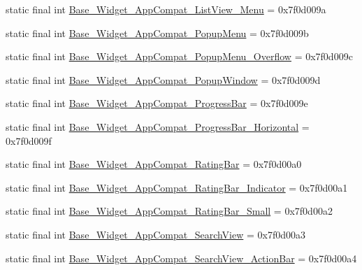 \begin{DoxyCompactItemize}
static final int \mbox{\hyperlink{classandroid_1_1support_1_1design_1_1R_1_1style_a9748000d54fe84d19a7f2ccad569c9bd}{Base\+\_\+\+Widget\+\_\+\+App\+Compat\+\_\+\+List\+View\+\_\+\+Menu}} = 0x7f0d009a
\item 
static final int \mbox{\hyperlink{classandroid_1_1support_1_1design_1_1R_1_1style_a6fc90d604807e924feefb0adf2a7d2cc}{Base\+\_\+\+Widget\+\_\+\+App\+Compat\+\_\+\+Popup\+Menu}} = 0x7f0d009b
\item 
static final int \mbox{\hyperlink{classandroid_1_1support_1_1design_1_1R_1_1style_a98001ced76638358f860dec36e44a24c}{Base\+\_\+\+Widget\+\_\+\+App\+Compat\+\_\+\+Popup\+Menu\+\_\+\+Overflow}} = 0x7f0d009c
\item 
static final int \mbox{\hyperlink{classandroid_1_1support_1_1design_1_1R_1_1style_a49fc2bbb8931372170f422a8229577c2}{Base\+\_\+\+Widget\+\_\+\+App\+Compat\+\_\+\+Popup\+Window}} = 0x7f0d009d
\item 
static final int \mbox{\hyperlink{classandroid_1_1support_1_1design_1_1R_1_1style_a2384abd094179a592f3c1c84ec9aabb7}{Base\+\_\+\+Widget\+\_\+\+App\+Compat\+\_\+\+Progress\+Bar}} = 0x7f0d009e
\item 
static final int \mbox{\hyperlink{classandroid_1_1support_1_1design_1_1R_1_1style_abc208c47da65fac306b8bd7d3296541b}{Base\+\_\+\+Widget\+\_\+\+App\+Compat\+\_\+\+Progress\+Bar\+\_\+\+Horizontal}} = 0x7f0d009f
\item 
static final int \mbox{\hyperlink{classandroid_1_1support_1_1design_1_1R_1_1style_aeb00a759a3ab19c1053273d89650332b}{Base\+\_\+\+Widget\+\_\+\+App\+Compat\+\_\+\+Rating\+Bar}} = 0x7f0d00a0
\item 
static final int \mbox{\hyperlink{classandroid_1_1support_1_1design_1_1R_1_1style_a114549220794f5cf8da42886c05c022b}{Base\+\_\+\+Widget\+\_\+\+App\+Compat\+\_\+\+Rating\+Bar\+\_\+\+Indicator}} = 0x7f0d00a1
\item 
static final int \mbox{\hyperlink{classandroid_1_1support_1_1design_1_1R_1_1style_a7cdc7d47a673704484633b1521a1c956}{Base\+\_\+\+Widget\+\_\+\+App\+Compat\+\_\+\+Rating\+Bar\+\_\+\+Small}} = 0x7f0d00a2
\item 
static final int \mbox{\hyperlink{classandroid_1_1support_1_1design_1_1R_1_1style_afc9c2fe90f72204a9993c2ea0c330d0f}{Base\+\_\+\+Widget\+\_\+\+App\+Compat\+\_\+\+Search\+View}} = 0x7f0d00a3
\item 
static final int \mbox{\hyperlink{classandroid_1_1support_1_1design_1_1R_1_1style_ac5099d28ea4e2f3af04743b760fad8ec}{Base\+\_\+\+Widget\+\_\+\+App\+Compat\+\_\+\+Search\+View\+\_\+\+Action\+Bar}} = 0x7f0d00a4

\end{DoxyCompactItemize}
